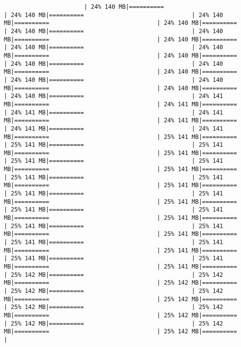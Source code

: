 \documentclass[
]{article}
\begin{document}
\begin{verbatim}
                       | 24% 140 MB|==========                               | 24% 140 MB|==========                               | 24% 140 MB|==========                               | 24% 140 MB|==========                               | 24% 140 MB|==========                               | 24% 140 MB|==========                               | 24% 140 MB|==========                               | 24% 140 MB|==========                               | 24% 140 MB|==========                               | 24% 140 MB|==========                               | 24% 140 MB|==========                               | 24% 140 MB|==========                               | 24% 140 MB|==========                               | 24% 140 MB|==========                               | 24% 140 MB|==========                               | 24% 140 MB|==========                               | 24% 140 MB|==========                               | 24% 141 MB|==========                               | 24% 141 MB|==========                               | 24% 141 MB|==========                               | 24% 141 MB|==========                               | 24% 141 MB|==========                               | 24% 141 MB|==========                               | 24% 141 MB|==========                               | 25% 141 MB|==========                               | 25% 141 MB|==========                               | 25% 141 MB|==========                               | 25% 141 MB|==========                               | 25% 141 MB|==========                               | 25% 141 MB|==========                               | 25% 141 MB|==========                               | 25% 141 MB|==========                               | 25% 141 MB|==========                               | 25% 141 MB|==========                               | 25% 141 MB|==========                               | 25% 141 MB|==========                               | 25% 141 MB|==========                               | 25% 141 MB|==========                               | 25% 141 MB|==========                               | 25% 141 MB|==========                               | 25% 141 MB|==========                               | 25% 141 MB|==========                               | 25% 141 MB|==========                               | 25% 141 MB|==========                               | 25% 141 MB|==========                               | 25% 141 MB|==========                               | 25% 141 MB|==========                               | 25% 141 MB|==========                               | 25% 141 MB|==========                               | 25% 142 MB|==========                               | 25% 142 MB|==========                               | 25% 142 MB|==========                               | 25% 142 MB|==========                               | 25% 142 MB|==========                               | 25% 142 MB|==========                               | 25% 142 MB|==========                               | 25% 142 MB|==========                               | 25% 142 MB|==========                               | 25% 142 MB|==========                               | 25% 142 MB|==========                               | 25% 142 MB|==========                               | 
\end{verbatim}
\end{document}
